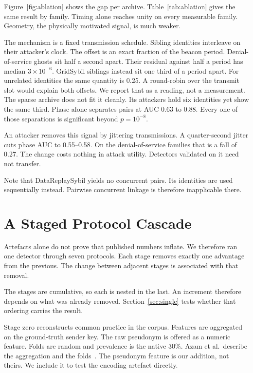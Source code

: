 \documentclass[journal,twoside]{IEEEtran}
\begin{document}
Figure~\ref{fig:ablation} shows the gap per archive.
Table~\ref{tab:ablation} gives the same result by family.
Timing alone reaches unity on every measurable family.
Geometry, the physically motivated signal, is much weaker.

The mechanism is a fixed transmission schedule.
Sibling identities interleave on their attacker's clock.
The offset is an exact fraction of the beacon period.
Denial-of-service ghosts sit half a second apart.
Their residual against half a period has median $3\times10^{-6}$.
GridSybil siblings instead sit one third of a period apart.
For unrelated identities the same quantity is 0.25.
A round-robin over the transmit slot would explain both offsets.
We report that as a reading, not a measurement.
The sparse archive does not fit it cleanly.
Its attackers hold six identities yet show the same third.
Phase alone separates pairs at AUC 0.63 to 0.88.
Every one of those separations is significant beyond $p=10^{-8}$.

An attacker removes this signal by jittering transmissions.
A quarter-second jitter cuts phase AUC to 0.55--0.58.
On the denial-of-service families that is a fall of 0.27.
The change costs nothing in attack utility.
Detectors validated on it need not transfer.

Note that DataReplaySybil yields no concurrent pairs.
Its identities are used sequentially instead.
Pairwise concurrent linkage is therefore inapplicable there.

\section{A Staged Protocol Cascade}
\label{sec:cascade}

Artefacts alone do not prove that published numbers inflate.
We therefore ran one detector through seven protocols.
Each stage removes exactly one advantage from the previous.
The change between adjacent stages is associated with that removal.

The stages are cumulative, so each is nested in the last.
An increment therefore depends on what was already removed.
Section~\ref{sec:single} tests whether that ordering carries the result.

Stage zero reconstructs common practice in the corpus.
Features are aggregated on the ground-truth sender key.
The raw pseudonym is offered as a numeric feature.
Folds are random and prevalence is the native 30\%.
Azam et al.\ describe the aggregation and the folds~\cite{azam2022}.
The pseudonym feature is our addition, not theirs.
We include it to test the encoding artefact directly.
\end{document}
